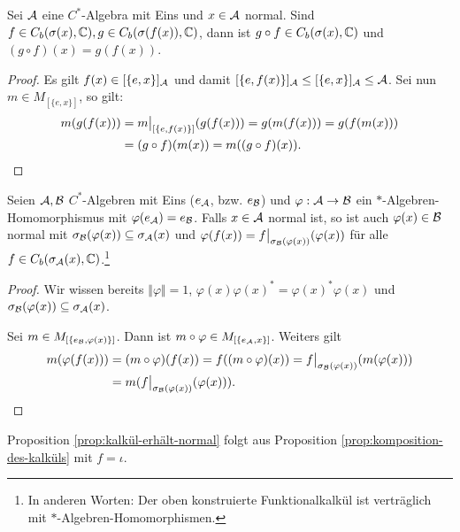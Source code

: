 \begin{proposition} \label{prop:komposition-des-kalküls}
    Sei $\mathcal{A}$ eine $C^*$-Algebra mit Eins und $x \in \mathcal{A}$ normal. Sind $f \in C_b(\sigma(x), \mathbb{C}), g \in C_b(\sigma(f(x)), \mathbb{C})$, dann ist $g \circ f \in C_b(\sigma(x), \mathbb{C})$ und $(g \circ f)(x) = g(f(x))$.
\end{proposition}

\begin{proof}
    Es gilt $f(x) \in [\{e, x\}]_{\mathcal{A}}$ und damit $[\{ e, f(x) \}]_{\mathcal{A}} \leq [\{ e, x \}]_{\mathcal{A}} \leq \mathcal{A}$. Sei nun $m \in M_{[\{e,x\}]}$, so gilt:
    \begin{align*}
        m(g(f(x))) &= \restr{m}{[\{e,f(x)\}]}{(g(f(x)))} = g(m(f(x))) = g(f(m(x))) \\
        &= (g \circ f)(m(x)) = m((g \circ f)(x)). \qedhere
    \end{align*}
\end{proof}

\begin{proposition} \label{prop:kalkül-erhält-normal}
    Seien $\mathcal{A}, \mathcal{B}$ $C^*$-Algebren mit Eins ($e_{\mathcal{A}}$, bzw. $e_{\mathcal{B}}$) und $\varphi : \mathcal{A} \to \mathcal{B}$ ein $\ast$-Algebren-Homomorphismus mit $\varphi(e_{\mathcal{A}}) = e_{\mathcal{B}}$. Falls $x \in \mathcal{A}$ normal ist, so ist auch $\varphi(x) \in \mathcal{B}$ normal mit $\sigma_{\mathcal{B}}(\varphi(x)) \subseteq \sigma_{\mathcal{A}}(x)$ und $\varphi(f(x)) = \restr{f}{\sigma_\Ba(\varphi(x))} (\varphi(x))$ für alle $f \in C_b(\sigma_{\mathcal{A}}(x), \mathbb{C})$.\footnote{In anderen Worten: Der oben konstruierte Funktionalkalkül ist verträglich mit $\ast$-Algebren-Homomorphismen.}
\end{proposition}

\begin{proof}
    Wir wissen bereits $\Vert \varphi \Vert = 1$, $\varphi(x) \varphi(x)^* = \varphi(x)^* \varphi(x)$ und $\sigma_{\mathcal{B}}(\varphi(x)) \subseteq \sigma_{\mathcal{A}}(x)$.

    Sei $m \in M_{[\{ e_{\mathcal{B}}, \varphi(x) \}]}$. Dann ist $m \circ \varphi \in M_{[\{ e_{\mathcal{A}}, x \}]}$. Weiters gilt
    \begin{align*}
        m(\varphi(f(x))) &= (m \circ \varphi)(f(x)) = f((m \circ \varphi)(x)) = \restr{f}{\sigma_\Ba (\varphi(x))} (m(\varphi(x))) \\
        &= m(\restr{f}{\sigma_\Ba (\varphi(x))} (\varphi(x))). \qedhere
    \end{align*}
\end{proof}

Proposition \ref{prop:kalkül-erhält-normal} folgt aus Proposition \ref{prop:komposition-des-kalküls} mit $f = \iota$.

